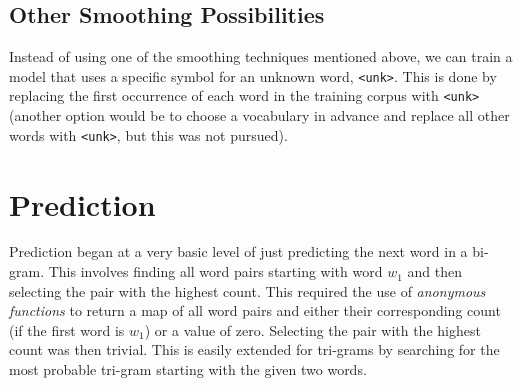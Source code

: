 \subsection{Other Smoothing Possibilities}\label{sec:otherSmoothing}

Instead of using one of the smoothing techniques mentioned above, we can train a model that uses a specific symbol for an unknown word, \lstinline!<unk>!. This is done by replacing the first occurrence of each word in the training corpus with \lstinline!<unk>! (another option would be to choose a vocabulary in advance and replace all other words with \lstinline!<unk>!, but this was not pursued).


\section{Prediction}



Prediction began at a very basic level of just predicting the next word in a bi-gram. This involves finding all word pairs starting with word $w_{1}$ and then selecting the pair with the highest count. This required the use of \textit{anonymous functions} to return a map of all word pairs and either their corresponding count (if the first word is $w_{1}$) or a value of zero. Selecting the pair with the highest count was then trivial. This is easily extended for tri-grams by searching for the most probable tri-gram starting with the given two words.

%

